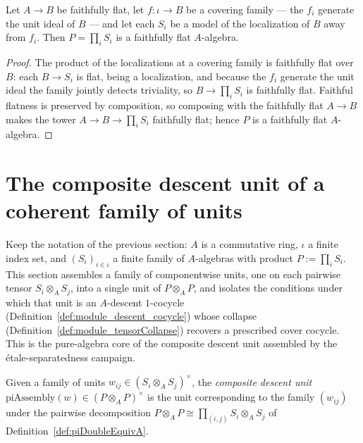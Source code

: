 \begin{theorem}
  \label{thm:pi_tower}
  \leanok
  Let \(A \to B\) be faithfully flat, let \(f \colon \iota \to B\) be a covering family — the
  \(f_i\) generate the unit ideal of \(B\) — and let each \(S_i\) be a model of the localization
  of \(B\) away from \(f_i\). Then \(P = \prod_i S_i\) is a faithfully flat \(A\)-algebra.
\end{theorem}
\begin{proof}
  \leanok
  The product of the localizations at a covering family is faithfully flat over \(B\): each
  \(B \to S_i\) is flat, being a localization, and because the \(f_i\) generate the unit ideal
  the family jointly detects triviality, so \(B \to \prod_i S_i\) is faithfully flat. Faithful
  flatness is preserved by composition, so composing with the faithfully flat \(A \to B\) makes
  the tower \(A \to B \to \prod_i S_i\) faithfully flat; hence \(P\) is a faithfully flat
  \(A\)-algebra.
\end{proof}

\section{The composite descent unit of a coherent family of units}
\label{sec:piAssembly}

Keep the notation of the previous section: \(A\) is a commutative ring, \(\iota\) a finite
index set, and \((S_i)_{i \in \iota}\) a finite family of \(A\)-algebras with product
\(P := \prod_i S_i\). This section assembles a family of componentwise units, one on each
pairwise tensor \(S_i \otimes_A S_j\), into a single unit of \(P \otimes_A P\), and isolates
the conditions under which that unit is an \(A\)-descent \(1\)-cocycle
(Definition~\ref{def:module_descent_cocycle}) whose collapse
(Definition~\ref{def:module_tensorCollapse}) recovers a prescribed cover cocycle. This is
the pure-algebra core of the composite descent unit assembled by the \'etale-separatedness
campaign.

\begin{definition}
  \label{def:piAssemblyUnit}
  \leanok
  Given a family of units \(w_{ij} \in (S_i \otimes_A S_j)^{\times}\), the \emph{composite
  descent unit} \(\mathrm{piAssembly}(w) \in (P \otimes_A P)^{\times}\) is the unit
  corresponding to the family \((w_{ij})\) under the pairwise decomposition
  \(P \otimes_A P \cong \prod_{(i,j)} S_i \otimes_A S_j\) of
  Definition~\ref{def:piDoubleEquivA}.
\end{definition}

